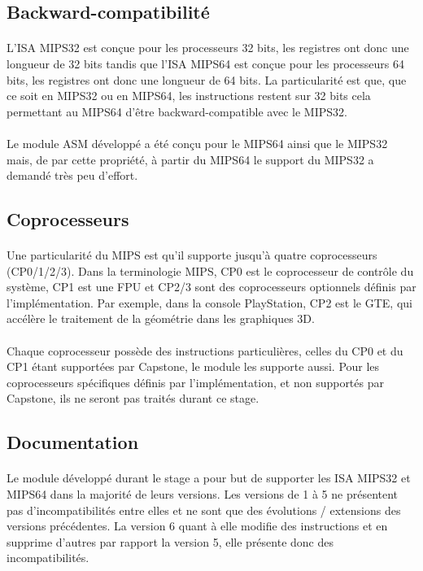 \documentclass[11pt, book, english, french, standardlists]{upmethodology-document}
\begin{document}
			\subsection{Backward-compatibilité}
				\paragraph*{}
					L'\gls{ISA} MIPS32 est conçue pour les processeurs 32 bits, les registres ont donc une longueur de 32 bits tandis que l'\gls{ISA} MIPS64 est conçue pour les processeurs 64 bits, les registres ont donc une longueur de 64 bits. La particularité est que, que ce soit en MIPS32 ou en MIPS64, les instructions restent sur 32 bits cela permettant au MIPS64 d'être backward-compatible avec le MIPS32.
				\paragraph*{}
					Le module ASM développé a été conçu pour le MIPS64 ainsi que le MIPS32 mais, de par cette propriété, à partir du MIPS64 le support du MIPS32 a demandé très peu d'effort.
			\subsection{Coprocesseurs}
				\paragraph*{}
					Une particularité du \gls{MIPS} est qu'il supporte jusqu'à quatre coprocesseurs (CP0/1/2/3). Dans la terminologie \gls{MIPS}, CP0 est le coprocesseur de contrôle du système, CP1 est une \gls{FPU} et CP2/3 sont des coprocesseurs optionnels définis par l'implémentation. Par exemple, dans la console PlayStation, CP2 est le \gls{GTE}, qui accélère le traitement de la géométrie dans les graphiques 3D.
				\paragraph*{}
					Chaque coprocesseur possède des instructions particulières, celles du CP0 et du CP1 étant supportées par Capstone, le module les supporte aussi. Pour les coprocesseurs spécifiques définis par l'implémentation, et non supportés par Capstone, ils ne seront pas traités durant ce stage.
			\subsection{Documentation}
				\paragraph*{}
					Le module développé durant le stage a pour but de supporter les \gls{ISA} MIPS32 et MIPS64 dans la majorité de leurs versions. Les versions de 1 à 5 ne présentent pas d'incompatibilités entre elles et ne sont que des évolutions / extensions des versions précédentes. La version 6 quant à elle modifie des instructions et en supprime d'autres par rapport la version 5, elle présente donc des incompatibilités.
\end{document}
